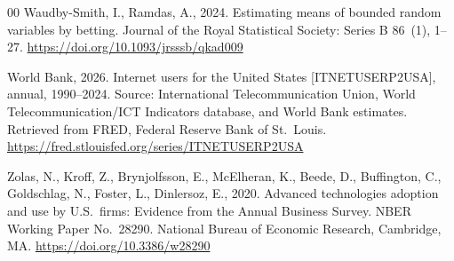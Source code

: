 \documentclass[review,authoryear,12pt]{elsarticle}
\begin{document}
\begin{thebibliography}{00}
Waudby-Smith, I., Ramdas, A., 2024. Estimating means of bounded random variables by betting. Journal of the Royal Statistical Society: Series B 86~(1), 1--27. \url{https://doi.org/10.1093/jrsssb/qkad009}

World Bank, 2026. Internet users for the United States [ITNETUSERP2USA], annual, 1990--2024. Source: International Telecommunication Union, World Telecommunication/ICT Indicators database, and World Bank estimates. Retrieved from FRED, Federal Reserve Bank of St.\ Louis. \url{https://fred.stlouisfed.org/series/ITNETUSERP2USA}

Zolas, N., Kroff, Z., Brynjolfsson, E., McElheran, K., Beede, D., Buffington, C., Goldschlag, N., Foster, L., Dinlersoz, E., 2020. Advanced technologies adoption and use by U.S.\ firms: Evidence from the Annual Business Survey. NBER Working Paper No.\ 28290. National Bureau of Economic Research, Cambridge, MA. \url{https://doi.org/10.3386/w28290}

\end{thebibliography}
\end{document}
